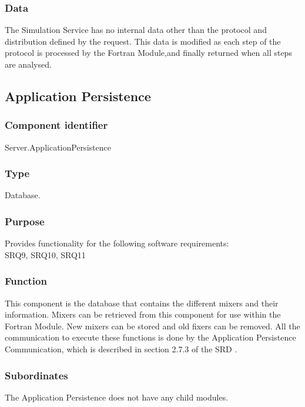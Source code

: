 \subsubsection*{Data}
The Simulation Service has no internal data other than the protocol and distribution defined by the request. This data is modified as each step of the protocol is processed by the Fortran Module,and finally returned when all steps are analysed.

\subsection{Application Persistence}

\subsubsection*{Component identifier}
Server.ApplicationPersistence

\subsubsection*{Type}
Database.

\subsubsection*{Purpose}
Provides functionality for the following software requirements:\\
SRQ9, SRQ10, SRQ11

\subsubsection*{Function}
This component is the database that contains the different mixers and their information. Mixers can be retrieved from this component for use within the Fortran Module. New mixers can be stored and old fixers can be removed. All the communication to execute these functions is done by the Application Persistence Communication, which is described in section 2.7.3 of the SRD \cite{srd}.

\subsubsection*{Subordinates}
The Application Persistence does not have any child modules.

